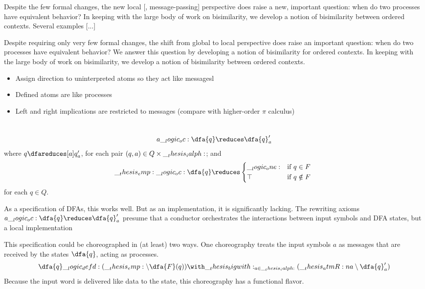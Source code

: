 Despite the few formal changes, the new local [, message-passing] perspective does raise a new, important question: when do two processes have equivalent behavior?
In keeping with the large body of work on bisimilarity\autocite{??}, we develop a notion of bisimilarity between ordered contexts.
Several examples [...]

Despite requiring only very few formal changes, the shift from global to local perspective does raise an important question: when do two processes have equivalent behavior?
We answer this question by developing a notion of bisimilarity for ordered contexts.
In keeping with the large body of work on bisimilarity\autocite{??}, we develop a notion of bisimilarity between ordered contexts.

\begin{itemize}
\item Assign direction to uninterpreted atoms so they act like messagesl
\item Defined atoms are like processes
\item Left and right implications are restricted to messages (compare with higher-order $\pi$ calculus)
\end{itemize}


\section{}

\begin{equation*}
  a \oc \dfa{q} \reduces \dfa{q}'_a
\end{equation*}
where $q \dfareduces[a] q'_a$, for each pair $(q, a) \in Q \times \__thesis_ialph:$; and 
\begin{equation*}
  \emp \oc \dfa{q} \reduces
    \begin{cases*}
      \one & if $q \in F$ \\
      \top & if $q \notin F$
    \end{cases*}
\end{equation*}
for each $q \in Q$.

As a specification of \acp{DFA}, this works well.
But as an implementation, it is significantly lacking.
The rewriting axioms $a \oc \dfa{q} \reduces \dfa{q}'_a$ presume that a conductor orchestrates the interactions between input symbols and \ac{DFA} states, but a local implementation 

This specification could be choreographed in (at least) two ways.
One choreography treats the input symbols $a$ as messages that are received by the states $\dfa{q}$, acting as processes.
\begin{equation*}
  \dfa{q} \defd (\emp \limp \dfa{F}(q)) \with \bigwith_{a \in \ialph}(\atmR{a} \limp \dfa{q}'_a)
\end{equation*}
Because the input word is delivered like data to the state, this choreography has a functional flavor.

